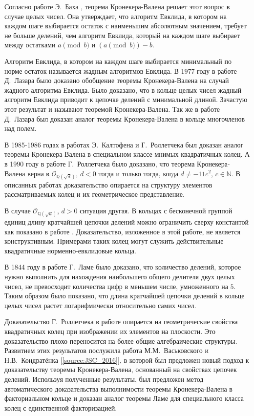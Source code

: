 \documentclass[_00_dissertation.tex]{subfiles}
\begin{document}
Согласно работе Э.~Баха \cite{source:Bach_Algorithmic_number_theory}, теорема Кронекера-Валена решает этот вопрос в случае целых чисел.
Она утверждает, что алгоритм Евклида, в котором на каждом шаге выбирается остаток с наименьшим абсолютным значением, требует не больше делений, чем алгоритм Евклида, который на каждом шаге выбирает между остатками $a\pmod{b}$ и $(a\pmod{b})-b$.

Алгоритм Евклида, в котором на каждом шаге выбирается минимальный по норме остаток называется жадным алгоритмов Евклида.
В 1977 году в работе Д.~Лазара \cite{source:Lazard} было доказано обобщение теоремы Кронекера-Валена на случай жадного алгоритма Евклида.
Было доказано, что в кольце целых чисел жадный алгоритм Евклида приводит к цепочке делений с минимальной длиной.
Зачастую этот результат и называют теоремой Кронекера-Валена.
Так же в работе Д.~Лазара был доказан аналог теоремы Кронекера-Валена в кольце многочленов над полем.

В 1985-1986 годах в работах Э.~Калтофена и Г.~Роллетчека \cite{source:Kaltofen, source:Rolletschek_1986} был доказан аналог теоремы Кронекера-Валена в специальном классе мнимых квадратичных колец.
А в 1990 году в работе Г.~Роллетчека \cite{source:Rolletschek_1990} было доказано, что теорема Кронекера-Валена верна в $\mathcal{O}_{\mathbb{Q}(\sqrt{d})}$, $d < 0$ тогда и только тогда, когда $d \neq -11c^{2}$, $c \in \mathbb{N}$.
В описанных работах доказательство опирается на структуру элементов рассматриваемых колец и их геометрическое представление.

В случае $\mathcal{O}_{\mathbb{Q}(\sqrt{d})}$, $d > 0$ ситуация другая.
В кольцах с бесконечной группой единиц длину кратчайшей цепочки делений можно ограничить сверху константой как показано в работе \cite{source:Cooke}.
Доказательство, изложенное в этой работе, не является конструктивным.
Примерами таких колец могут служить действительные квадратичные норменно-евклидовые кольца.

В 1844 году в работе Г.~Ламе было доказано, что количество делений, которое нужно выполнить для нахождения наибольшего общего делителя двух целых чисел, не превосходит количества цифр в меньшем числе, умноженного на $5$.
Таким образом было показано, что длина кратчайшей цепочки делений в кольце целых чисел растет логарифмически относительно самих чисел.

Доказательство Г.~Роллетчека в работе \cite{source:Rolletschek_1990} опирается на геометрические свойства квадратичных колец при изображении их элементов на плоскости.
Это доказательство плохо переносится на более общие алгебраические структуры.
Развитием этих результатов послужила работа М.М.~Васьковского и Н.В.~Кондратёнка [\ref{source:JSC_2016}], в которой был предложен новый подход к доказательству теоремы Кронекера-Валена, основанный на свойствах цепочек делений.
Используя полученные результаты, был предложен метод автоматического доказательства выполнимости теоремы Кронекера-Валена в факториальном кольце и доказан аналог теоремы Ламе для специального класса колец с единственной факторизацией.
\end{document}

